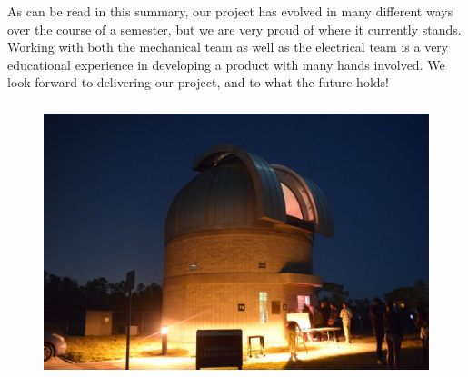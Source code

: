 \documentclass[12pt]{report}
\begin{document}
As can be read in this summary, our project has evolved in many different ways over the course of a semester, but we are very proud of where it currently stands. Working with both the mechanical team as well as the electrical team is a very educational experience in developing a product with many hands involved. We look forward to delivering our project, and to what the future holds! 

\begin{figure}[h]
	\centering
	\includegraphics[width=0.8\linewidth, height=8.0cm]{tele}
\end{figure}

\printbibliography[title={References}]
\end{document}
